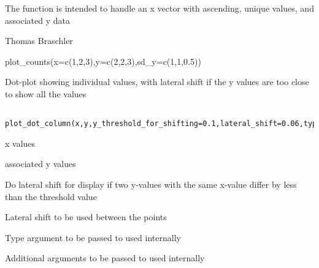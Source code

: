 \documentclass[a4paper]{book}
\begin{document}
%
\begin{Details}\relax
The function is intended to handle an x vector with ascending, unique values, and associated y data
\end{Details}
%
\begin{Author}\relax
Thomas Braschler
\end{Author}
%
\begin{Examples}
\begin{ExampleCode}
plot_counts(x=c(1,2,3),y=c(2,2,3),sd_y=c(1,1,0.5))

\end{ExampleCode}
\end{Examples}
%
\begin{Description}\relax
Dot-plot showing individual values, with lateral shift if the y values are too close to show all the values
\end{Description}
%
\begin{Usage}
\begin{verbatim}
	             
plot_dot_column(x,y,y_threshold_for_shifting=0.1,lateral_shift=0.06,type="p",group_order=NULL,...)
\end{verbatim}
\end{Usage}
%
\begin{Arguments}
\begin{ldescription}
\item[\code{x}] 
x values

\item[\code{y}] 
associated y values

\item[\code{y\_threshold\_for\_shifting}] 
Do lateral shift for display if two y-values with the same x-value differ by less than the threshold value


\item[\code{lateral\_shift}] 
Lateral shift to be used between the points


\item[\code{type}] 
Type argument to be passed to  used internally


\item[\code{...}] 
Additional arguments to be passed to  used internally



\end{ldescription}
\end{Arguments}
\end{document}
